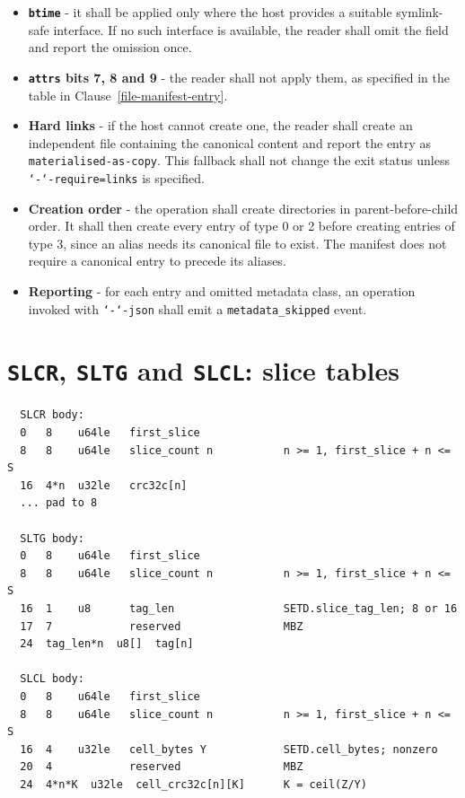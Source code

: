\documentclass[10pt,a4paper]{report}
\newcommand{\option}[1]{\texttt{\char`-\char`-#1}}
\begin{document}
\begin{itemize}
  rejected by \verb|extract| and \verb|repair| \option{to}.
\item
  \textbf{\texttt{btime}} - it shall be applied only where the host provides a
  suitable symlink-safe interface. If no such interface is available, the
  reader shall omit the field and report the omission once.
\item
  \textbf{\texttt{attrs} bits 7, 8 and 9} - the reader shall not apply them, as
  specified in the table in Clause~\ref{file-manifest-entry}.
\item
  \textbf{Hard links} - if the host cannot create one, the reader shall create
  an independent file containing the canonical content and report the entry as
  \verb|materialised-as-copy|. This fallback shall not change the exit status
  unless \option{require=links} is specified.
\item
  \textbf{Creation order} - the operation shall create directories in
  parent-before-child order. It shall then create every entry of type 0 or 2
  before creating entries of type 3, since an alias needs its canonical file to
  exist. The manifest does not require a canonical entry to precede its
  aliases.
\item
  \textbf{Reporting} - for each entry and omitted metadata class, an operation
  invoked with \option{json} shall emit a \verb|metadata_skipped| event.
\end{itemize}

\section{\texorpdfstring{\texttt{SLCR}, \texttt{SLTG} and
\texttt{SLCL}: slice
tables}{SLCR, SLTG and SLCL: slice tables}}\label{slcr-sltg-and-slcl-slice-tables}
\begin{verbatim}
  SLCR body:
  0   8    u64le   first_slice
  8   8    u64le   slice_count n           n >= 1, first_slice + n <= S
  16  4*n  u32le   crc32c[n]
  ... pad to 8

  SLTG body:
  0   8    u64le   first_slice
  8   8    u64le   slice_count n           n >= 1, first_slice + n <= S
  16  1    u8      tag_len                 SETD.slice_tag_len; 8 or 16
  17  7            reserved                MBZ
  24  tag_len*n  u8[]  tag[n]

  SLCL body:
  0   8    u64le   first_slice
  8   8    u64le   slice_count n           n >= 1, first_slice + n <= S
  16  4    u32le   cell_bytes Y            SETD.cell_bytes; nonzero
  20  4            reserved                MBZ
  24  4*n*K  u32le  cell_crc32c[n][K]      K = ceil(Z/Y)
\end{verbatim}
\end{document}
